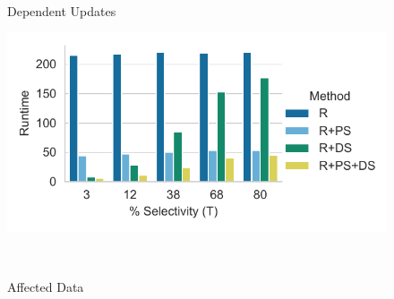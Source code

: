 \begin{figure}[t]
\begin{minipage}[b]{0.235\linewidth}
               \hspace{2mm}
                \\
               \vspace{-8mm}
               \caption{Dependent Updates}
               \label{fig:Dependent Updates}
               \end{minipage}
               \begin{minipage}[b]{0.225\linewidth}
               \includegraphics[width=1\linewidth,trim=0              0 0                                     0,                             clip]{imgs/felix_affected_data.pdf}      \\
               \vspace{-8mm}
               \caption{Affected                                      Data}
               \label{fig:Affected                                    Data}
               \end{minipage}                                         \\
\end{figure}

